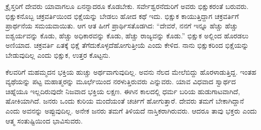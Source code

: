 ಕ್ರೈಸ್ತರಿಗೆ ದೇವರು ಯಾವಾಗಲೂ ಏನನ್ನಾದರೂ ಕೊಡಬೇಕು. ಸರ್ವೇಶ್ವರನೆದುರಿಗೆ ಅವರು ಭಿಕ್ಷುಕರಂತೆ ಬರುವರು. ಭಿಕ್ಷುಕನೊಬ್ಬ ಚಕ್ರವರ್ತಿಯಿಂದ ಭಿಕ್ಷೆಯನ್ನು ಬೇಡಲು ಹೋದ ಕಥೆ ಇದು. ಭಿಕ್ಷುಕ ಕಾಯುತ್ತಿದ್ದಾಗ ಚಕ್ರವರ್ತಿಗೆ ಪ್ರಾರ್ಥನೆಯ ಸಮಯವಾಯಿತು. ಆಗ ಆತ ಹೀಗೆ ಪ್ರಾರ್ಥಿಸತೊಡಗಿದ: “ದೇವರೆ, ನನಗೆ ಇನ್ನೂ ಹೆಚ್ಚು ಹೆಚ್ಚು ಐಶ್ವರ್ಯವನ್ನು ಕೊಡು, ಹೆಚ್ಚು ಅಧಿಕಾರವನ್ನು ಕೊಡು, ಹೆಚ್ಚು ರಾಜ್ಯವನ್ನು ಕೊಡು.” ಭಿಕ್ಷುಕ ಅಲ್ಲಿಂದ ಹೊರಡಲು ಅಣಿಯಾದ. ಚಕ್ರವರ್ತಿ ಏತಕ್ಕೆ ಭಿಕ್ಷೆ ತೆಗೆದುಕೊಳ್ಳದೆ\break ಹೋಗುತ್ತೀಯೆ ಎಂದು ಕೇಳಿದ. ನಾನು ಭಿಕ್ಷುಕರಿಂದ ಭಿಕ್ಷೆಯನ್ನು ಬೇಡುವುದಿಲ್ಲ ಎಂದು ಭಿಕ್ಷುಕ, ಉತ್ತರ ಕೊಟ್ಟನು.

ಕೆಲವರಿಗೆ ಮಹಮ್ಮದನ ಭಕ್ತಿಯ ಹುಚ್ಚು ಅರ್ಥವಾಗುವುದಿಲ್ಲ. ಅವನು ನೆಲದ ಮೇಲೆ\break ಬಿದ್ದು ಹೊರಳಾಡುತ್ತಿದ್ದ. ಇಂತಹ ವ್ಯಥೆಯನ್ನು ಪಟ್ಟ ಮಹಾತ್ಮರನ್ನು ಮೂರ್ಛೆಯಿಂದ ನರಳುತ್ತಿರುವರು ಎನ್ನುವರು. ಯಾವ ವಿಧವಾದ ಸ್ವಾರ್ಥದ ಚಿಹ್ನೆಯೂ ಇಲ್ಲದಿರುವುದೇ ನಿಜವಾದ ಭಕ್ತಿಯ ಲಕ್ಷಣ. ಈಗಿನ ಕಾಲದಲ್ಲಿ ಧರ್ಮ ಬರಿಯ ಹುಡುಗಾಟವಾಗಿದೆ, ಷೋಕಿಯಾಗಿದೆ. ಜನರು ಒಂದು ಕುರಿಯ ಮಂದೆಯಂತೆ ಚರ್ಚಿಗೆ ಹೋಗುತ್ತಾರೆ. ದೇವರು ತಮಗೆ ಬೇಕಾಗಿದ್ದಾನೆ ಎಂದು ಅವನನ್ನು ಅಪ್ಪುವುದಿಲ್ಲ. ಅನೇಕ ಜನರು ತಮಗೆ ತಿಳಿಯದೆ ನಾಸ್ತಿಕರಾಗಿರುವರು. ಆದರೂ ತಾವು ಭಕ್ತರು ಎಂದು ಆತ್ಮ ಸಂತುಷ್ಟಿಯಿಂದ ಭಾವಿಸುವರು.


